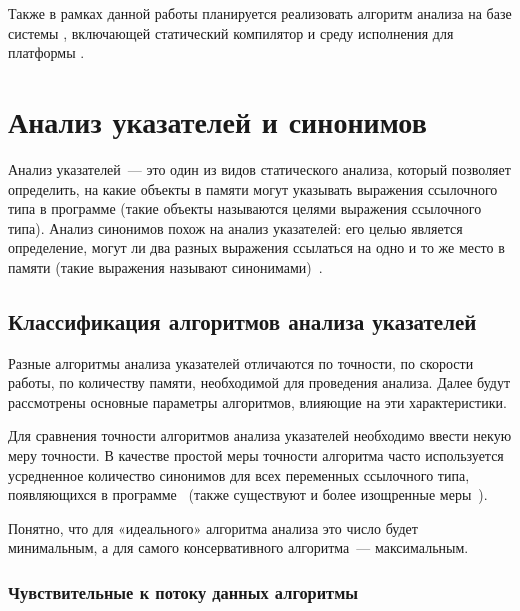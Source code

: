 \documentclass[14pt,titlepage,draft]{extarticle}
\begin{document}
    Также в рамках данной работы планируется реализовать алгоритм
    анализа на базе системы ,
    включающей статический компилятор и среду исполнения для платформы
    .

  \section{Анализ указателей и синонимов}

    Анализ указателей~--- это один из видов статического анализа, который
    позволяет определить, на какие объекты в памяти могут указывать выражения
    ссылочного типа в программе (такие объекты называются целями выражения
    ссылочного типа). Анализ синонимов похож на анализ указателей: его целью
    является определение, могут ли два разных выражения ссылаться на одно и
    то же место в памяти (такие выражения называют синонимами)~\cite{andersen}.

    \subsection{Классификация алгоритмов анализа указателей}
    \label{section:analysis_classification}

      Разные алгоритмы анализа указателей отличаются по точности, по скорости
      работы, по количеству памяти, необходимой для проведения анализа.
      Далее будут рассмотрены основные параметры алгоритмов, влияющие на эти
      характеристики.

      Для сравнения точности алгоритмов анализа указателей необходимо ввести
      некую меру точности. В качестве простой меры точности алгоритма часто
      используется усредненное количество синонимов для всех переменных
      ссылочного типа, появляющихся в
      программе~\cite[раздел~3.2]{hind_pointer_analysis_not_solved_yet}
      (также существуют и более изощренные
      меры~\cite{hind_pointer_analysis_not_solved_yet,diwan_tbaa}).

      Понятно, что для «идеального» алгоритма анализа это число будет
      минимальным, а для самого консервативного алгоритма~--- максимальным.

      \subsubsection{Чувствительные к потоку данных алгоритмы}
        \label{section:analysis_classification_data_flow}
\end{document}
